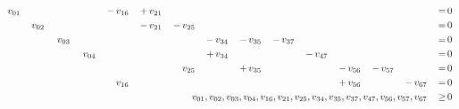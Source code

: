 \documentclass[10pt,a4paper,oneside,ngerman,numbers=noenddot]{scrartcl}
\begin{document}
\begin{alignat*}{15}
			\;&\, v_{01} && && && &-&\, v_{16} \,&+&\, v_{21} \,&& && && && && && && && \,&=&\, 0 \\
			\;& &&\, v_{02} \,&& && && &-&\, v_{21} \,&-&\, v_{25} \,&& && && && && && && \,&=&\, 0 \\
			\;& && &&\, v_{03} \,&& && && && &-&\, v_{34} \,&-&\, v_{35} \,&-&\, v_{37} \,&& && && && \,&=&\, 0 \\
			\;& && && &&\, v_{04} \,&& && && &+&\, v_{34} \,&& && &-&\, v_{47} \,&& && && \,&=&\, 0 \\
			\;& && && && && && &&\, v_{25} \,&& &+&\, v_{35} \,&& && &-&\, v_{56} \,&-&\, v_{57} \,&& \,&=&\, 0 \\
			\;& && && && &&\, v_{16} \,&& && && && && && &+&\, v_{56} \,&& &-&\, v_{67} \,&=&\, 0 \\
			\multicolumn{28}{r}{$v_{01}, v_{02}, v_{03}, v_{04}, v_{16}, v_{21}, v_{25}, v_{34}, v_{35}, v_{37}, v_{47}, v_{56}, v_{57}, v_{67}$} \,&\geq &\, 0
		\end{alignat*}
\end{document}
